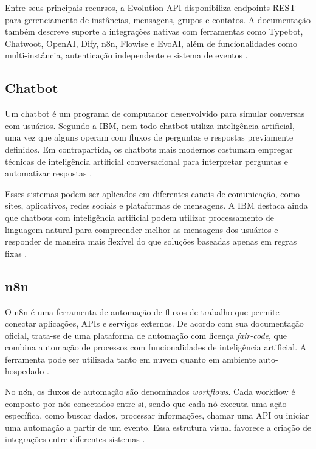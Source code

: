 Entre seus principais recursos, a Evolution API disponibiliza endpoints REST para gerenciamento de instâncias, mensagens, grupos e contatos. A documentação também descreve suporte a integrações nativas com ferramentas como Typebot, Chatwoot, OpenAI, Dify, n8n, Flowise e EvoAI, além de funcionalidades como multi-instância, autenticação independente e sistema de eventos \cite{evolution_api_docs_2026}.

\subsection{Chatbot}

Um chatbot é um programa de computador desenvolvido para simular conversas com usuários. Segundo a IBM, nem todo chatbot utiliza inteligência artificial, uma vez que alguns operam com fluxos de perguntas e respostas previamente definidos. Em contrapartida, os chatbots mais modernos costumam empregar técnicas de inteligência artificial conversacional para interpretar perguntas e automatizar respostas \cite{ibm_chatbot_2026}.

Esses sistemas podem ser aplicados em diferentes canais de comunicação, como sites, aplicativos, redes sociais e plataformas de mensagens. A IBM destaca ainda que chatbots com inteligência artificial podem utilizar processamento de linguagem natural para compreender melhor as mensagens dos usuários e responder de maneira mais flexível do que soluções baseadas apenas em regras fixas \cite{ibm_chatbot_2026}.

\subsection{n8n}

O n8n é uma ferramenta de automação de fluxos de trabalho que permite conectar aplicações, APIs e serviços externos. De acordo com sua documentação oficial, trata-se de uma plataforma de automação com licença \textit{fair-code}, que combina automação de processos com funcionalidades de inteligência artificial. A ferramenta pode ser utilizada tanto em nuvem quanto em ambiente auto-hospedado \cite{n8n_docs_2026}.

No n8n, os fluxos de automação são denominados \textit{workflows}. Cada workflow é composto por nós conectados entre si, sendo que cada nó executa uma ação específica, como buscar dados, processar informações, chamar uma API ou iniciar uma automação a partir de um evento. Essa estrutura visual favorece a criação de integrações entre diferentes sistemas \cite{n8n_workflows_2026}.

